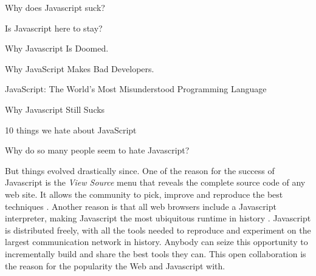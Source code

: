 {
\fontsize{10pt}{10pt}\selectfont
Why does Javascript suck?

Is Javascript here to stay?

Why Javascript Is Doomed.

Why JavaScript Makes Bad Developers.

JavaScript: The World's Most Misunderstood Programming Language

Why Javascript Still Sucks

10 things we hate about JavaScript

Why do so many people seem to hate Javascript?
}

But things evolved drastically since.
One of the reason for the success of Javascript is the \textit{View Source} menu that reveals the complete source code of any web site.
It allows the community to pick, improve and reproduce the best techniques .
Another reason is that all web browsers include a Javascript interpreter, making Javascript the most ubiquitous runtime in history \cite{Flanagan2006}.
Javascript is distributed freely, with all the tools needed to reproduce and experiment on the largest communication network in history.
Anybody can seize this opportunity to incrementally build and share the best tools they can.
This open collaboration is the reason for the popularity the Web and Javascript with.


